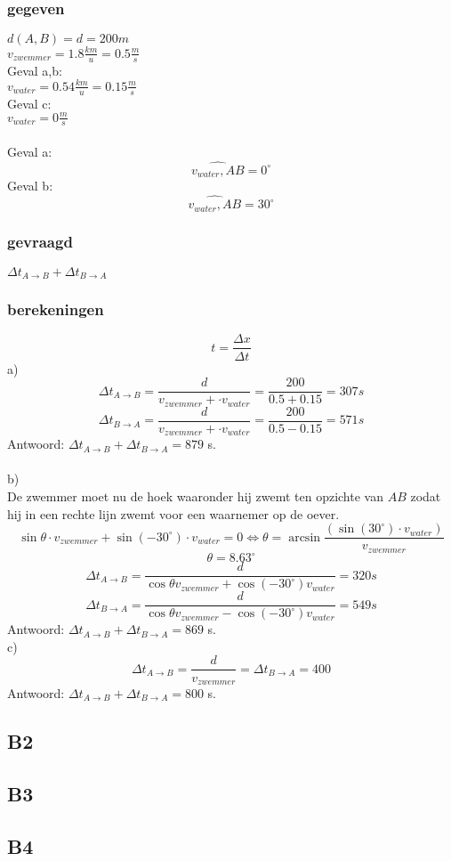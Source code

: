 \documentclass[10pt,a4paper]{article}
\begin{document}
\subsubsection*{gegeven}
$d(A,B) = d = 200m$\\
$v_{zwemmer}=1.8\frac{km}{u}=0.5\frac{m}{s}$\\
Geval a,b:\\
$v_{water}= 0.54\frac{km}{u}=0.15\frac{m}{s}$\\
Geval c:\\
$v_{water}= 0\frac{m}{s}$\\\\
Geval a: \[\widehat{v_{water},AB} = 0^\circ\]
Geval b: \[\widehat{v_{water},AB} = 30^\circ\]

\subsubsection*{gevraagd}
$\Delta t_{A\rightarrow B} + \Delta t_{B\rightarrow A}$

\subsubsection*{berekeningen}
\[
t = \frac{\Delta x}{\Delta t}
\]
a)\\
\[
\Delta t_{A\rightarrow B} = \frac{d}{v_{zwemmer} + \cdot v_{water}} = \frac{200}{0.5+0.15} = 307 s
\]
\[
\Delta t_{B\rightarrow A} = \frac{d}{v_{zwemmer} + \cdot v_{water}} = \frac{200}{0.5-0.15} = 571 s
\]
Antwoord:
$\Delta t_{A\rightarrow B} + \Delta t_{B\rightarrow A} = 879$ s.\\\\
b)\\
De zwemmer moet nu de hoek waaronder hij zwemt ten opzichte van $AB$ zodat hij in een rechte lijn zwemt voor een waarnemer op de oever.
\[
\sin{\theta}\cdot v_{zwemmer} + \sin{(-30^\circ)}\cdot v_{water} = 0 \Leftrightarrow \theta=\arcsin{\frac{(\sin{(30^\circ)}\cdot v_{water})}{v_{zwemmer}}}
\]
\[
\theta = 8.63^\circ
\]
\[
\Delta t_{A\rightarrow B} = \frac{d}{\cos{\theta}v_{zwemmer} + \cos{(-30^\circ)}v_{water}}=320 s
\]
\[
\Delta t_{B\rightarrow A} = \frac{d}{\cos{\theta}v_{zwemmer} - \cos{(-30^\circ)}v_{water}}=549 s
\]
Antwoord:
$\Delta t_{A\rightarrow B} + \Delta t_{B\rightarrow A} = 869$ s.\\
c)\\
\[
\Delta t_{A\rightarrow B} = \frac{d}{v_{zwemmer}} = \Delta t_{B\rightarrow A} = 400
\]
Antwoord:
$\Delta t_{A\rightarrow B} + \Delta t_{B\rightarrow A} = 800$ s.\\

\subsection{B2}

\subsection{B3}

\subsection{B4}
\end{document}
